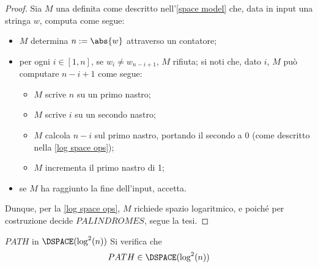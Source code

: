 \documentclass[a4paper, 12pt]{report}
\begin{document}
    \begin{proof}
        Sia $M$ una \TM definita come descritto nell'\cref{space model} che, data in input una stringa $w$, computa come segue:

        \begin{itemize}
            \item $M$ determina $n := \abs{w}$ attraverso un contatore;
            \item per ogni $i \in [1, n]$, se $w_i \neq w_{n - i + 1}$, $M$ rifiuta; si noti che, dato $i$, $M$ può computare $n - i + 1$ come segue:

                \begin{itemize}
                    \item $M$ scrive $n$ su un primo nastro;
                    \item $M$ scrive $i$ su un secondo nastro;
                    \item $M$ calcola $n - i$ sul primo nastro, portando il secondo a 0 (come descritto nella \cref{log space ops});
                    \item $M$ incrementa il primo nastro di 1;
                \end{itemize}
            \item se $M$ ha raggiunto la fine dell'input, accetta.
        \end{itemize}

        Dunque, per la \cref{log space ops}, $M$ richiede spazio logaritmico, e poiché per costruzione decide $PALINDROMES$, segue la tesi.
    \end{proof}

    \begin{framedthm}[label={path in log sq}]{$PATH$ in $\DSPACE(\log^2(n))$}
        Si verifica che $$PATH \in \DSPACE(\log^2(n))$$
    \end{framedthm}
\end{document}
